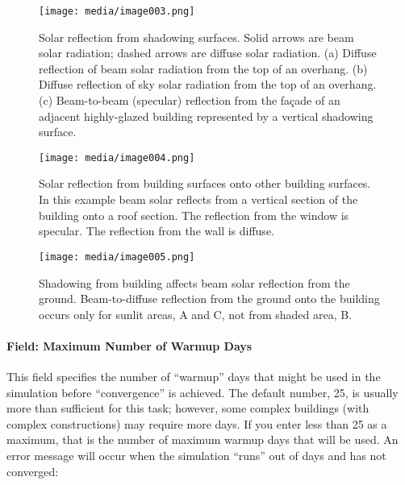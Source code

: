 \begin{figure}[hbtp] %
    \centering
    \texttt{[image: media/image003.png]}
    \caption{  Solar reflection from shadowing surfaces. Solid arrows are beam solar radiation; dashed arrows are diffuse solar radiation. (a) Diffuse reflection of beam solar radiation from the top of an overhang. (b) Diffuse reflection of sky solar radiation from the top of an overhang. (c) Beam-to-beam (specular) reflection from the façade of an adjacent highly-glazed building represented by a vertical shadowing surface. \protect \label{fig:solar-reflection-from-shadowing-surfaces.}}
\end{figure}

\begin{figure}[hbtp] %
    \centering
    \texttt{[image: media/image004.png]}
    \caption{  Solar reflection from building surfaces onto other building surfaces. In this example beam solar reflects from a vertical section of the building onto a roof section. The reflection from the window is specular. The reflection from the wall is diffuse. \protect \label{fig:solar-reflection-from-building-surfaces-onto}}
\end{figure}

\begin{figure}[hbtp] %
    \centering
    \texttt{[image: media/image005.png]}
    \caption{Shadowing from building affects beam solar reflection from the ground. Beam-to-diffuse reflection from the ground onto the building occurs only for sunlit areas, A and C, not from shaded area, B. \protect \label{fig:shadowing-from-building-affects-beam-solar}}
\end{figure}

\paragraph{Field: Maximum Number of Warmup Days}\label{field-maximum-number-of-warmup-days}

This field specifies the number of ``warmup'' days that might be used in the simulation before ``convergence'' is achieved. The default number, 25, is usually more than sufficient for this task; however, some complex buildings (with complex constructions) may require more days. If you enter less than 25 as a maximum, that is the number of maximum warmup days that will be used. An error message will occur when the simulation ``runs'' out of days and has not converged:

